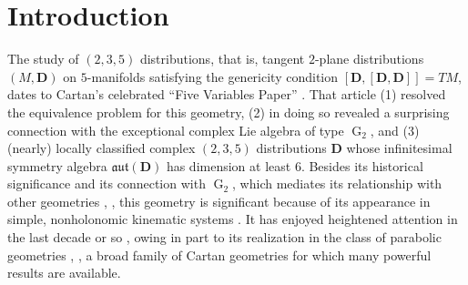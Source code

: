 \documentclass[pdftex]{sigma}
\DeclareMathOperator{\G} {G}
\newcommand{\mbD}{\mathbf{D}}
\newcommand{\mfaut}{\mathfrak{aut}}
\numberwithin{equation}{section}
\begin{document}

\newcommand{\arXivNumber}{1807.02734}

\renewcommand{\PaperNumber}{008}

\FirstPageHeading










\section{Introduction}

The study of $(2, 3, 5)$ distributions, that is, tangent $2$-plane distributions $(M, \mbD)$ on $5$-manifolds satisfying the genericity condition $[\mbD, [\mbD, \mbD]] = TM$, dates to Cartan's celebrated ``Five Variables Paper'' \cite{CartanFiveVariables}. That article (1) resolved the equivalence problem for this geometry, (2) in doing so revealed a surprising connection with the exceptional complex Lie algebra of type $\G_2$, and (3) (nearly) locally classified complex $(2, 3, 5)$ distributions $\mbD$ whose infinitesimal symmetry algebra $\mfaut(\mbD)$ has dimension at least $6$. Besides its historical significance and its connection with $\G_2$, which mediates its relationship with other geometries \cite{CapSagerschnig, GPW, GrahamWillse, HammerlSagerschnig, HammerlSagerschnigTwistor, LeistnerNurowski, LNS}, \cite[Section~5]{Nurowski}, this geometry is significant because of its appearance in simple, nonholonomic kinematic systems \cite{BorMontgomery, BryantHsu}. It has enjoyed heightened attention in the last decade or so \cite{AnNurowski, AnNurowskiPlebanskiMetric, DaveHaller, DoubrovGovorovCounterexample, DHS, DoubrovKruglikov, IKTY, IKY, Randall,SagerschnigWillseOperator, SagerschnigWillseGeometry, Strazzullo, WillseHeisenberg, WillseCounterexample}, owing in part to its realization in the class of parabolic geometries \cite[Section~4.3.2]{CapSlovak}, \cite{Sagerschnig, SagerschnigThesis}, a broad family of Cartan geometries for which many powerful results are available.
\end{document}
